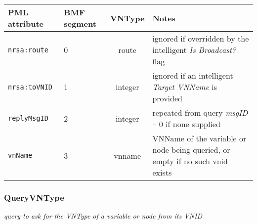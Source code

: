 \documentclass[pdftex,a4paper]{article}
\newcommand{\XMLfont}[1]{{\tt \small #1}}
\begin{document}
\begin{table}[!h]
  \begin{center}
    \label{tab:ReplyVNName}
    \begin{tabular}{|l|p{13mm}|c|p{60mm}|}
      \hline

      \textbf{PML attribute} & \textbf{BMF segment} & \textbf{VNType}
      & \textbf{Notes} \\\hline

      \XMLfont{nrsa:route} & 0 & route & ignored if overridden by the
      intelligent {\em Is Broadcast?} flag \\ \hline

      \XMLfont{nrsa:toVNID} & 1 & integer & ignored if an intelligent {\em
      Target VNName} is provided \\\hline

      \XMLfont{replyMsgID} & 2 & integer & repeated from query {\em
      msgID} -- 0 if none supplied \\\hline

      \XMLfont{vnName} & 3 & vnname & VNName of the variable or
      node being queried, or empty if no such vnid exists \\\hline

    \end{tabular}
  \end{center}
\end{table}

\clearpage

\subsubsection{QueryVNType}

{\em query to ask for the VNType of a variable or node from its VNID}
\end{document}
